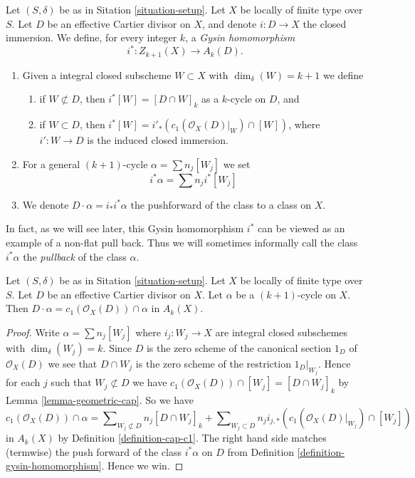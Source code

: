 \begin{definition}
\label{definition-gysin-homomorphism}
Let $(S, \delta)$ be as in Sitation \ref{situation-setup}.
Let $X$ be locally of finite type over $S$.
Let $D$ be an effective Cartier divisor on $X$, and
denote $i : D \to X$ the closed immersion.
We define, for every integer $k$, a
{\it Gysin homomorphism}
$$
i^* : Z_{k + 1}(X) \to A_k(D).
$$
\begin{enumerate}
\item Given a integral closed subscheme $W \subset X$ with
$\dim_\delta(W) = k + 1$ we define
\begin{enumerate}
\item if $W \not \subset D$, then $i^*[W] = [D \cap W]_k$ as a
$k$-cycle on $D$, and
\item if $W \subset D$, then
$i^*[W] = i'_*(c_1(\mathcal{O}_X(D)|_W) \cap [W])$,
where $i' : W \to D$ is the induced closed immersion.
\end{enumerate}
\item For a general $(k + 1)$-cycle $\alpha = \sum n_j[W_j]$
we set
$$
i^*\alpha = \sum n_j i^*[W_j]
$$
\item We denote $D \cdot \alpha = i_*i^*\alpha$ the pushforward of
the class to a class on $X$.
\end{enumerate}
\end{definition}

\noindent
In fact, as we will see later, this Gysin homomorphism $i^*$ can be viewed
as an example of a non-flat pull back. Thus we will sometimes informally
call the class $i^*\alpha$ the {\it pullback} of the class $\alpha$.

\begin{lemma}
\label{lemma-support-cap-effective-Cartier}
Let $(S, \delta)$ be as in Sitation \ref{situation-setup}.
Let $X$ be locally of finite type over $S$.
Let $D$ be an effective Cartier divisor on $X$.
Let $\alpha$ be a $(k + 1)$-cycle on $X$.
Then $D \cdot \alpha = c_1(\mathcal{O}_X(D)) \cap \alpha$
in $A_k(X)$.
\end{lemma}

\begin{proof}
Write $\alpha = \sum n_j[W_j]$ where $i_j : W_j \to X$ are integral closed
subschemes with $\dim_\delta(W_j) = k$.
Since $D$ is the zero scheme of the canonical section $1_D$ of
$\mathcal{O}_X(D)$ we see that $D \cap W_j$ is the zero scheme
of the restriction $1_D|_{W_j}$. Hence for each $j$ such that
$W_j \not \subset D$ we have
$c_1(\mathcal{O}_X(D)) \cap [W_j] = [D \cap W_j]_k$
by Lemma \ref{lemma-geometric-cap}. So we have
$$
c_1(\mathcal{O}_X(D)) \cap \alpha
=
\sum\nolimits_{W_j \not \subset D} n_j[D \cap W_j]_k
+
\sum\nolimits_{W_j \subset D}
n_j i_{j, *}(c_1(\mathcal{O}_X(D)|_{W_j}) \cap [W_j])
$$
in $A_k(X)$ by Definition \ref{definition-cap-c1}.
The right hand side matches (termwise) the push forward of the class
$i^*\alpha$ on $D$ from Definition \ref{definition-gysin-homomorphism}.
Hence we win.
\end{proof}

